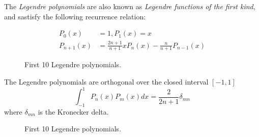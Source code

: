 \documentclass[12pt]{article} %
\theoremstyle{plain}
\theoremstyle{definition}
\theoremstyle{remark}
\begin{document}
The \emph{Legendre polynomials} are also known as \emph{Legendre functions of the 
first kind}, and sastisfy the following recurrence relation:

\begin{align*}
P_0(x) &= 1, P_1(x) = x \\
P_{n+1}(x) &= \frac{2n+1}{n+1}xP_n(x) - \frac{n}{n+1}P_{n-1}(x)
\end{align*}

\begin{figure}[H] %
\caption{First 10 Legendre polynomials.}
\label{fig:legendre}
\end{figure}

The Legendre polynomials are orthogonal over the closed interval 
$[-1, 1]$
\begin{equation*}
\int_{-1}^{1} P_n(x)P_m(x) dx = \frac{2}{2n+1} \delta_{mn}
\end{equation*}
where $\delta_{mn}$ is the Kronecker delta.\cite{Weisstein}


\begin{figure}[H] %
\caption{First 10 Legendre polynomials.}
\label{fig:legendre_normal}
\end{figure}
\end{document}
